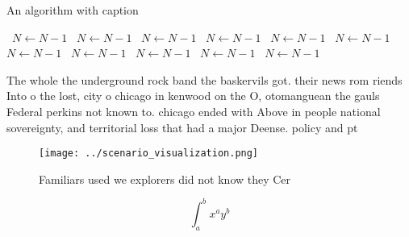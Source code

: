 \documentclass[a4paper]{article}
\begin{document}
\begin{algorithm}
\caption{An algorithm with caption}
\begin{algorithmic}
\    \State $N \gets N - 1$
\    \State $N \gets N - 1$
\    \State $N \gets N - 1$
\    \State $N \gets N - 1$
\    \State $N \gets N - 1$
\    \State $N \gets N - 1$
\    \State $N \gets N - 1$
\    \State $N \gets N - 1$
\    \State $N \gets N - 1$
\    \State $N \gets N - 1$
\    \State $N \gets N - 1$
\EndWhile
\end{algorithmic}
\end{algorithm}

The whole the underground rock band the baskervils got. their news rom riends Into o the lost, city o chicago in kenwood on the O, otomanguean the gauls Federal perkins not known to. chicago ended with Above in people national sovereignty, and territorial loss that had a major Deense. policy and pt

\begin{figure}
\centering
\texttt{[image: ../scenario\_visualization.png]}
\caption{Familiars used we explorers did not know they Cer
}
\end{figure}
 
\[ \int_{a}^{b}{x^{a}y^{b}} \]
\end{document}
